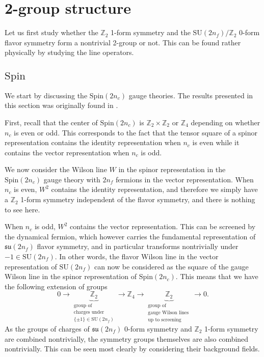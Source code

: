 \documentclass[12pt]{article}
\numberwithin{equation}{section}
\def\bZ{\mathbb{Z}}
\def\SU{\mathrm{SU}}
\def\su{\mathfrak{su}}
\def\Spin{\mathrm{Spin}}
\begin{document}
\section{2-group structure}
\label{sec:2-group}
Let us first study whether the $\bZ_2$ 1-form symmetry and the $\SU(2n_f)/\bZ_2$ 0-form flavor symmetry form a nontrivial 2-group or not. 
This can be found rather physically by studying the line operators. 

\subsection{$\Spin$}
We start by discussing the $\Spin(2n_c)$ gauge theories. 
The results presented in this section was originally found in \cite[Sec.~4.4]{Hsin:2020nts}.

First, recall that the center of $\Spin(2n_c)$ is $\bZ_2\times \bZ_2$ or $\bZ_4$ depending on whether $n_c$ is even or odd.
This corresponds to the fact that the tensor square of a spinor representation contains the identity representation when $n_c$ is even while it contains the vector representation when $n_c$ is odd.

We now consider the Wilson line $W$ in the spinor representation in the $\Spin(2n_c)$ gauge theory with $2n_f$ fermions in the vector representation.
When $n_c$ is even, $W^2$ contains the identity representation, and therefore we simply have a $\bZ_2$ 1-form symmetry independent of the flavor symmetry, and there is nothing to see here.

When $n_c$ is odd, $W^2$ contains the vector representation.
This can be screened by the dynamical fermion, which however carries the fundamental representation of $\su(2n_f)$ flavor symmetry, 
and in particular transforms nontrivially under $-1\in \SU(2n_f)$.
In other words, the flavor Wilson line in the vector representation of $\SU(2n_f)$ can now be considered as the square  of the gauge Wilson line in the spinor representation of $\Spin(2n_c)$.
This means that we have the following extension of groups \begin{equation}
0\to \underbrace{\bZ_2}_{\substack{\text{group of}\\
\text{charges under}\\
\text{$\{\pm1\}\in \SU(2n_f)$}}}
\to \bZ_4 
\to \underbrace{\bZ_2}_{\substack{\text{group of}\\\text{gauge Wilson lines }\\
\text{up to screening}}} \to 0.
\label{charge-extension}
\end{equation}
As the groups of charges of $\su(2n_f)$ 0-form symmetry and $\bZ_2$ 1-form symmetry are combined nontrivially, 
the symmetry groups themselves are also combined nontrivially.
This can be seen most clearly by considering their background fields.
\end{document}
